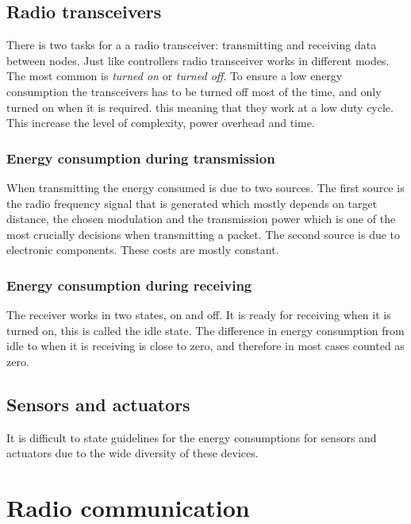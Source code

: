 \subsection{Radio transceivers}
  
There is two tasks for a a radio transceiver: transmitting and receiving data between nodes. Just like controllers radio transceiver works in different modes. The most common is \emph{turned on} or \emph{turned off}. To ensure a low energy consumption the transceivers has to be turned off most of the time, and only turned on when it is required. this meaning that they work at a low duty cycle.
This increase the level of complexity, power overhead and time. 
  
\subsubsection*{Energy consumption during transmission}
When transmitting the energy consumed is due to two sources. The first source is the radio frequency signal that is generated which mostly depends on target distance, the chosen modulation and the transmission power which is one of the most crucially decisions when transmitting a packet. The second source is due to electronic components. These costs are mostly constant.

\subsubsection*{Energy consumption during receiving}
The receiver works in two states, on and off. It is ready for receiving when it is turned on, this is called the idle state. The difference in energy consumption from idle to when it is receiving is close to zero, and therefore in most cases counted as zero.


\subsection{Sensors and actuators}
It is difficult to state guidelines for the energy consumptions for sensors and actuators due to the wide diversity of these devices.
  
 
\section{Radio communication}